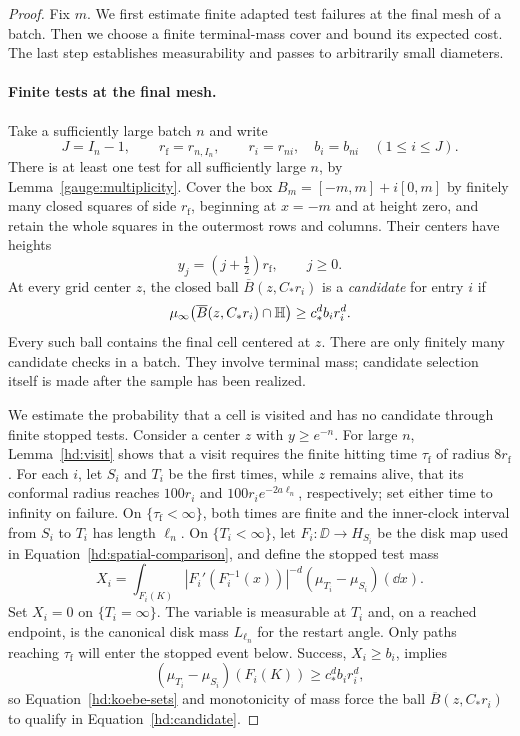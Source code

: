 \begin{proof}
Fix $m$. We first estimate finite adapted test failures at the final
mesh of a batch. Then we choose a finite terminal-mass cover and bound
its expected cost. The last step establishes measurability and passes
to arbitrarily small diameters.

\paragraph{Finite tests at the final mesh.}
Take a sufficiently large batch $n$ and write
\[
 J=I_n-1,\qquad r_{\mathrm f}=r_{n,I_n},\qquad
 r_i=r_{ni},\quad b_i=b_{ni}\quad(1\le i\le J).
\]
There is at least one test for all sufficiently large \(n\), by
Lemma~\ref{gauge:multiplicity}. Cover the box
\(B_m=[-m,m]+i[0,m]\) by finitely many closed squares of side
\(r_{\mathrm f}\), beginning at \(x=-m\) and at height zero,
and retain the whole squares in the outermost rows and columns.
Their centers have heights
\[
 y_j=(j+\tfrac12)r_{\mathrm f},\qquad j\ge0.
\]
At every grid center \(z\), the closed ball
\(\overline B(z,C_*r_i)\) is a \emph{candidate} for entry \(i\)
if
\begin{equation}
 \mu_\infty\bigl(\overline B(z,C_*r_i)\cap\mathbb H\bigr)
       \ge c_*^d b_i r_i^d.
 \label{hd:candidate}
\end{equation}
Every such ball contains the final cell centered at \(z\).
There are only finitely many candidate checks in a batch.
They involve terminal mass; candidate selection itself is made
after the sample has been realized.

We estimate the probability that a cell is visited and has no
candidate through finite stopped tests. Consider a center \(z\) with \(y\ge e^{-n}\).
For large \(n\), Lemma~\ref{hd:visit} shows that a visit requires
the finite hitting time \(\tau_{\mathrm f}\) of radius
\(8r_{\mathrm f}\). For each \(i\), let \(S_i\) and \(T_i\) be
the first times, while \(z\) remains alive, that its conformal radius
reaches \(100r_i\) and \(100r_i e^{-2a\ell_n}\), respectively;
set either time to infinity on failure. On
\(\{\tau_{\mathrm f}<\infty\}\), both times are finite and the
inner-clock interval from \(S_i\) to \(T_i\) has length \(\ell_n\).
On \(\{T_i<\infty\}\), let \(F_i:\DD\to H_{S_i}\) be the disk map used in
Equation~\eqref{hd:spatial-comparison}, and define the stopped test mass
\begin{equation}
 X_i=\int_{F_i(K)}
       |F_i'(F_i^{-1}(x))|^{-d}
       (\mu_{T_i}-\mu_{S_i})(\dd x).
 \label{hd:stopped-test}
\end{equation}
Set \(X_i=0\) on \(\{T_i=\infty\}\).
The variable is measurable at \(T_i\) and, on a reached endpoint,
is the canonical disk mass \(L_{\ell_n}\) for the restart angle.
Only paths reaching
\(\tau_{\mathrm f}\) will enter the stopped event below.
Success, \(X_i\ge b_i\), implies
\[
 (\mu_{T_i}-\mu_{S_i})(F_i(K))\ge c_*^d b_i r_i^d,
\]
so Equation~\eqref{hd:koebe-sets} and monotonicity of mass force
the ball \(\overline B(z,C_*r_i)\) to qualify in
Equation~\eqref{hd:candidate}.


\end{proof}
